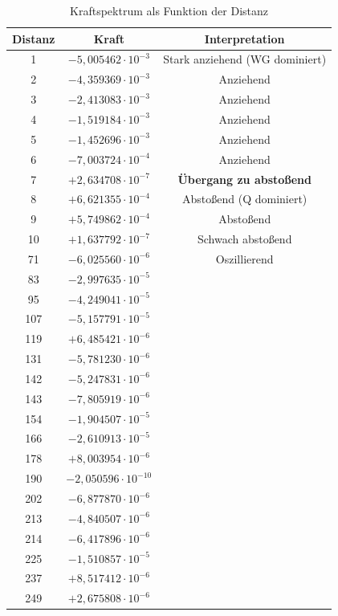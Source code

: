 \documentclass[12pt,a4paper]{article}
\begin{document}
\begin{table}[H]
\centering
\small
\begin{tabular}{c|c|c}
Distanz & Kraft & Interpretation \\
\hline
1 & $-5,005462\cdot 10^{-3}$ & Stark anziehend (WG dominiert) \\
2 & $-4,359369\cdot 10^{-3}$ & Anziehend \\
3 & $-2,413083\cdot 10^{-3}$ & Anziehend \\
4 & $-1,519184\cdot 10^{-3}$ & Anziehend \\
5 & $-1,452696\cdot 10^{-3}$ & Anziehend \\
6 & $-7,003724\cdot 10^{-4}$ & Anziehend \\
7 & $+2,634708\cdot 10^{-7}$ & \textbf{Übergang zu abstoßend} \\
8 & $+6,621355\cdot 10^{-4}$ & Abstoßend (Q dominiert) \\
9 & $+5,749862\cdot 10^{-4}$ & Abstoßend \\
10 & $+1,637792\cdot 10^{-7}$ & Schwach abstoßend \\
71 & $-6,025560\cdot 10^{-6}$ & Oszillierend \\
83 & $-2,997635\cdot 10^{-5}$ & \\
95 & $-4,249041\cdot 10^{-5}$ & \\
107 & $-5,157791\cdot 10^{-5}$ & \\
119 & $+6,485421\cdot 10^{-6}$ & \\
131 & $-5,781230\cdot 10^{-6}$ & \\
142 & $-5,247831\cdot 10^{-6}$ & \\
143 & $-7,805919\cdot 10^{-6}$ & \\
154 & $-1,904507\cdot 10^{-5}$ & \\
166 & $-2,610913\cdot 10^{-5}$ & \\
178 & $+8,003954\cdot 10^{-6}$ & \\
190 & $-2,050596\cdot 10^{-10}$ & \\
202 & $-6,877870\cdot 10^{-6}$ & \\
213 & $-4,840507\cdot 10^{-6}$ & \\
214 & $-6,417896\cdot 10^{-6}$ & \\
225 & $-1,510857\cdot 10^{-5}$ & \\
237 & $+8,517412\cdot 10^{-6}$ & \\
249 & $+2,675808\cdot 10^{-6}$ & \\
\end{tabular}
\caption{Kraftspektrum als Funktion der Distanz}
\label{tab:spectrum}
\end{table}
\end{document}
